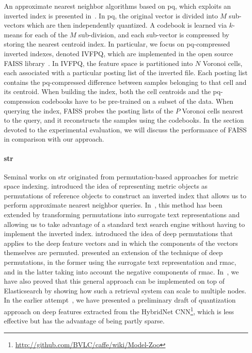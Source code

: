 An approximate nearest neighbor algorithms based on \acrfull{pq}, which exploits an inverted index is presented in~\cite{jegou2011product}.
In \gls{pq}, the original vector is divided into $M$ sub-vectors which are then independently quantized.
A codebook is learned via $k$-means for each of the $M$ sub-division, and each sub-vector is compressed by storing the nearest centroid index.
In particular, we focus on \gls{pq}-compressed inverted indexes, denoted IVFPQ, which are implemented in the open source FAISS library~\cite{johnson2017billion}.
In IVFPQ, the feature space is partitioned into $N$ Voronoi cells, each associated with a particular posting list of the inverted file.
Each posting list contains the \gls{pq}-compressed difference between samples belonging to that cell and its centroid.
When building the index, both the cell centroids and the \gls{pq}-compression codebooks have to be pre-trained on a subset of the data.
When querying the index, FAISS probes the posting lists of the $P$ Voronoi cells nearest to the query, and it reconstructs the samples using the codebooks.
In the section devoted to the experimental evaluation, we will discuss the performance of FAISS in comparison with our approach.

\paragraph{\acrlong{str}}
Seminal works on \gls{str} originated from permutation-based approaches for metric space indexing.
\citet{amato2014mi} introduced the idea of representing metric objects as permutations of reference objects to construct an inverted index that allows us to perform approximate nearest neighbor queries.
In~\cite{gennaro2010approach}, this method has been extended by transforming permutations into surrogate text representations and allowing us to take advantage of a standard text search engine without having to implement the inverted index.
\citet{amato2016deep} introduced the idea of deep permutations that applies to the deep feature vectors and in which the components of the vectors themselves are permuted.
\citet{amato2017efficient,amato2018large} presented an extension of the technique of deep permutations, in the former using the surrogate text representation and \gls{rmac}, and in the latter taking into account the negative components of \gls{rmac}.
In~\cite{amato2018large}, we have also proved that this general approach can be implemented on top of Elasticsearch by showing how such a retrieval system can scale to multiple nodes.
In the earlier attempt~\cite{amato2016large}, we have presented a preliminary draft of quantization approach on deep features extracted from the HybridNet  CNN\footnote{\url{http://github.com/BVLC/caffe/wiki/Model-Zoo}}, which is less effective but has the advantage of being partly sparse.


